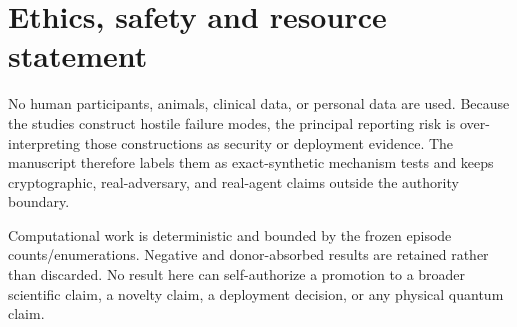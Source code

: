 \section{Ethics, safety and resource statement}

No human participants, animals, clinical data, or personal data are used. Because the studies construct hostile failure modes, the principal reporting risk is over-interpreting those constructions as security or deployment evidence. The manuscript therefore labels them as exact-synthetic mechanism tests and keeps cryptographic, real-adversary, and real-agent claims outside the authority boundary.

Computational work is deterministic and bounded by the frozen episode counts/enumerations. Negative and donor-absorbed results are retained rather than discarded. No result here can self-authorize a promotion to a broader scientific claim, a novelty claim, a deployment decision, or any physical quantum claim.